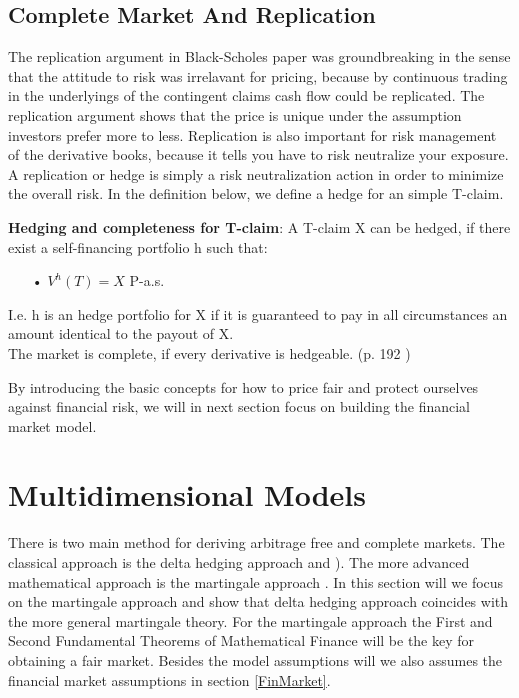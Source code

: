\subsection{Complete Market And Replication}
The replication argument in Black-Scholes paper \parencite{B-S-Paper} was groundbreaking in the sense that the attitude to risk was irrelavant for pricing, because by continuous trading in the underlyings of the contingent claims cash flow could be replicated. The replication argument shows that the price is unique under the assumption investors prefer more to less. Replication is also important for risk management of the derivative books, because it tells you have to risk neutralize your exposure. A replication or hedge is simply a risk neutralization action in order to minimize the overall risk. In the definition below, we define a hedge for an simple T-claim.
\theoremstyle{definition}
\begin{definition}{\textbf{Hedging and completeness for T-claim}:}
A T-claim X can be hedged, if there exist a self-financing portfolio h such that:
\begin{enumerate}
\item[•] $V^{h}(T)=X$ P-a.s.
\end{enumerate}
I.e. h is an hedge portfolio for X if it is guaranteed to pay in all circumstances an amount identical to the payout of X.\\
The market is complete, if every derivative is hedgeable.
(p. 192 \parencite{finKont})
\end{definition}

By introducing the basic concepts for how to price fair and protect ourselves against financial risk, we will in next section focus on building the financial market model.


\section{Multidimensional Models}\label{MultiDimModel}
There is two main method for deriving arbitrage free and complete markets. The classical approach is the delta hedging approach \parencite{B-S-Paper} and \parencite{CRR}). The more advanced mathematical approach is the martingale approach  \parencite{finKont}. In this section will we focus on the martingale approach and show that delta hedging approach coincides with the more general martingale theory. For the martingale approach the First and Second Fundamental Theorems of Mathematical Finance will be the key for obtaining a fair market. Besides the model assumptions will we also assumes the financial market assumptions in section \ref{FinMarket}.

